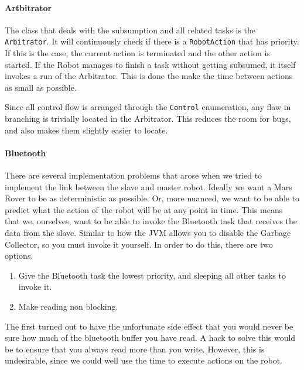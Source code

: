 \documentclass{scrartcl}
\begin{document}
\paragraph{Artbitrator}
The class that deals with the subsumption and all related tasks is the \texttt{Arbitrator}.
It will continuously check if there is a \texttt{RobotAction} that has priority.
If this is the case, the current action is terminated and the other action is started.
If the Robot manages to finish a task without getting subsumed, it itself invokes a run of the Arbitrator.
This is done the make the time between actions as small as possible.

Since all control flow is arranged through the \texttt{Control} enumeration, any flaw in branching is trivially located in the Arbitrator.
This reduces the room for bugs, and also makes them slightly easier to locate.

\paragraph{Bluetooth}
There are several implementation problems that arose when we tried to implement the link between the slave and master robot.
Ideally we want a Mars Rover to be as deterministic as possible.
Or, more nuanced, we want to be able to predict what the action of the robot will be at any point in time.
This means that we, ourselves, want to be able to invoke the Bluetooth task that receives the data from the slave.
Similar to how the JVM allows you to disable the Garbage Collector, so you must invoke it yourself.
In order to do this, there are two options.
\begin{enumerate}
	\item Give the Bluetooth task the lowest priority, and sleeping all other tasks to invoke it.
	\item Make reading non blocking.
\end{enumerate}

The first turned out to have the unfortunate side effect that you would never be sure how much of the bluetooth buffer you have read.
A hack to solve this would be to ensure that you always read more than you write.
However, this is undesirable, since we could well use the time to execute actions on the robot.
\end{document}
